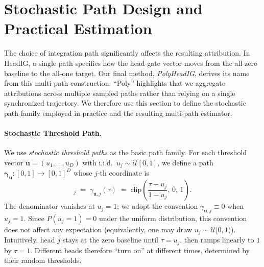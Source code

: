\section{Stochastic Path Design and Practical Estimation}
\label{sec:method:path}

The choice of integration path significantly affects the resulting attribution. In HeadIG, a single path specifies how the head-gate vector moves from the all-zero baseline to the all-one target. Our final method, \emph{PolyHeadIG}, derives its name from this multi-path construction: ``Poly'' highlights that we aggregate attributions across multiple sampled paths rather than relying on a single synchronized trajectory. We therefore use this section to define the stochastic path family employed in practice and the resulting multi-path estimator.


\paragraph{Stochastic Threshold Path.}
We use \emph{stochastic threshold paths} as the basic path family. For each threshold vector $\mathbf{u}=(u_1,\dots,u_D)$ with i.i.d.\ $u_j \sim \mathcal{U}[0,1]$, we define a path $\boldsymbol{\gamma}_{\mathbf{u}} : [0,1] \to [0,1]^D$ whose $j$-th coordinate is
\begin{equation}
[\boldsymbol{\gamma}_{\mathbf{u}}(\tau)]_j
\;=\;
\gamma_{\mathbf{u},j}(\tau)
\;=\;
\mathrm{clip}\!\left(\frac{\tau-u_j}{1-u_j},\,0,\,1\right).
\label{eq:alpha_path_stp}
\end{equation}
The denominator vanishes at $u_j=1$; we adopt the convention $\gamma_{\mathbf{u},j}\equiv 0$ when $u_j=1$. Since $P(u_j=1)=0$ under the uniform distribution, this convention does not affect any expectation (equivalently, one may draw $u_j\sim\mathcal{U}[0,1)$). Intuitively, head $j$ stays at the zero baseline until $\tau = u_j$, then ramps linearly to $1$ by $\tau = 1$. Different heads therefore ``turn on'' at different times, determined by their random thresholds.

